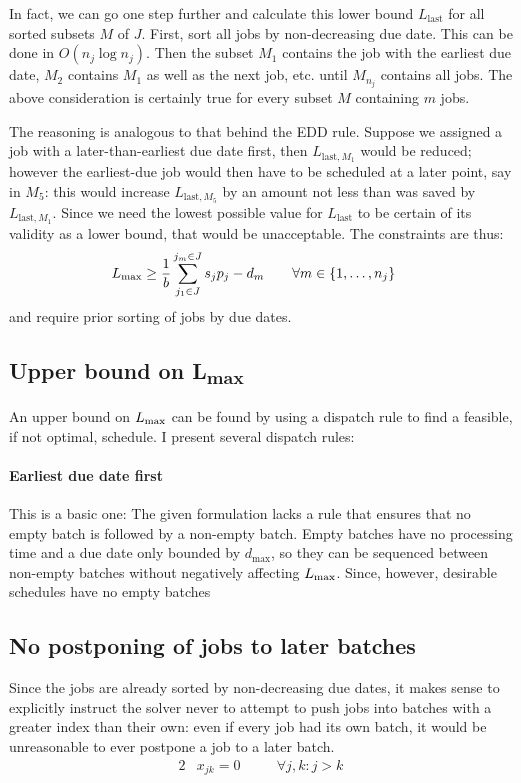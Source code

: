 \documentclass[13pt, letterpaper, twoside]{book}
\begin{document}
In fact, we can go one step further and calculate this lower bound $L_{\text{last}}$ for all sorted subsets $M$ of $J$. First, sort all jobs by non-decreasing due date. This can be done in $O(n_j \log n_j)$. Then the subset $M_1$ contains the job with the earliest due date, $M_2$ contains $M_1$ as well as the next job, etc. until $M_{n_j}$ contains all jobs. The above consideration is certainly true for every subset $M$ containing $m$ jobs.

The reasoning is analogous to that behind the EDD rule. Suppose we assigned a job with a later-than-earliest due date first, then $L_{\text{last},M_1}$ would be reduced; however the earliest-due job would then have to be scheduled at a later point, say in $M_5$: this would increase $L_{\text{last},M_5}$ by an amount not less than was saved by $L_{\text{last},M_1}$. Since we need the lowest possible value for $L_{\text{last}}$ to be certain of its validity as a lower bound, that would be unacceptable. The constraints are thus:
\begin{alignat}{2}
& L_{\text{max}} \geq \frac{1}{b} \sum_{j_1 \in J}^{j_m \in J} s_j p_j - d_m \quad && \forall m \in \{1, \dots, n_j\}
\end{alignat}
and require prior sorting of jobs by due dates.

\subsection{Upper bound on {\sansitalicfont L}\textsubscript{max}}
An upper bound on $L_{\text{max}}$ can be found by using a dispatch rule to find a feasible, if not optimal, schedule. I present several dispatch rules:

\paragraph{\fontsize{12pt}{14pt}\selectfont Earliest due date first} This is a basic one: The given formulation lacks a rule that ensures that no empty batch is followed by a non-empty batch. Empty batches have no processing time and a due date only bounded by $d_\text{max}$, so they can be sequenced between non-empty batches without negatively affecting $L_{\text{max}}$. Since, however, desirable schedules have no empty batches

\subsection{No postponing of jobs to later batches}
Since the jobs are already sorted by non-decreasing due dates, it makes sense to explicitly instruct the solver never to attempt to push jobs into batches with a greater index than their own: even if every job had its own batch, it would be unreasonable to ever postpone a job to a later batch.
\begin{alignat}{2}
  & x_{jk} = 0 \quad && \forall j,k : j > k
\end{alignat}
\end{document}

